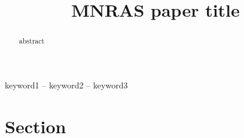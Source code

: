 \documentclass[fleqn,usenatbib]{mnras}
\title[Short title]{MNRAS paper title}
\begin{document}
\label{firstpage}
\pagerange{\pageref{firstpage}--\pageref{lastpage}}
\maketitle

\begin{abstract}
abstract
\end{abstract}

\begin{keywords}
keyword1 -- keyword2 -- keyword3
\end{keywords}

\section{Section}
\end{document}
